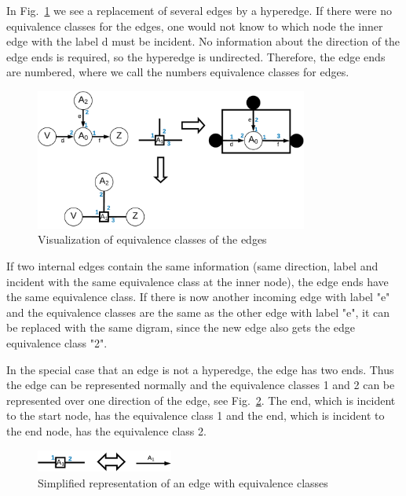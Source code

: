 In Fig.~\ref{fig:edgeEC} we see a replacement of several edges by a hyperedge. If there were no equivalence classes for the edges, one would not know to which node the inner edge with the label d must be incident. No information about the direction of the edge ends is required, so the hyperedge is undirected. Therefore, the edge ends are numbered, where we call the numbers equivalence classes for edges.
\begin{figure}[h]
	\centering
	\includegraphics[width=0.8\textwidth]{chapters/imgConcept/edgeEC}
	\caption{Visualization of equivalence classes of the edges}
	\label{fig:edgeEC}
\end{figure}



If two internal edges contain the same information (same direction, label and incident with the same equivalence class at the inner node), the edge ends have the same equivalence class. If there is now another incoming edge with label "e" and the equivalence classes are the same as the other edge with label "e", it can be replaced with the same digram, since the new edge also gets the edge equivalence class "2".


In the special case that an edge is not a hyperedge, the edge has two ends. Thus the edge can be represented normally and the equivalence classes 1 and 2 can be represented over one direction of the edge, see Fig.~\ref{fig:edgeECsimple}. The end, which is incident to the start node, has the equivalence class 1 and the end, which is incident to the end node, has the equivalence class 2.
\begin{figure}[h]
	\centering
	\includegraphics[width=0.4\textwidth]{chapters/imgConcept/edgeEC_simple}
	\caption{Simplified representation of an edge with equivalence classes}
	\label{fig:edgeECsimple}
\end{figure}


